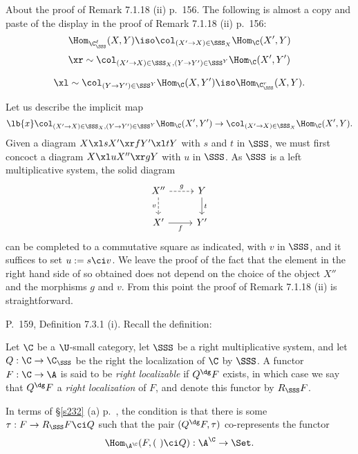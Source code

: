 \documentclass[12pt]{article}
\theoremstyle{remark}
\theoremstyle{definition}
\begin{document}
%

\begin{s}%
%
About the proof of Remark 7.1.18 (ii) p.~156. The following is almost a copy and paste of the display in the proof of Remark 7.1.18 (ii) p.~156: 
$$
\Hom_{\C_\SSS^\ell}(X,Y)\iso\col_{(X'\to X)\in\SSS_X}\Hom_\C(X',Y)
$$ 
$$
\xr\sim\col_{(X'\to X)\in\SSS_X,(Y\to Y')\in\SSS^Y}\Hom_\C(X',Y')
$$ 

$$\xl\sim\col_{(Y\to Y')\in\SSS^Y}\Hom_\C(X,Y')\iso\Hom_{\C_\SSS^r}(X,Y).$$ 

Let us describe the implicit map 
\begin{equation}\lb{x}
\col_{(X'\to X)\in\SSS_X,(Y\to Y')\in\SSS^Y}\Hom_\C(X',Y')\to\col_{(X'\to X)\in\SSS_X}\Hom_\C(X',Y).
\end{equation} 
Given a diagram $X\xl sX'\xr fY'\xl tY$ with $s$ and $t$ in $\SSS$, we must first concoct a diagram $X\xl uX''\xr gY$ with $u$ in $\SSS$. As $\SSS$ is a left multiplicative system, the solid diagram 
$$
\begin{tikzcd}
X''\ar[dashed]{d}[swap]{v}\ar[dashed]{r}{g}&Y\ar{d}{t}\\ 
X'\ar{r}[swap]{f}&Y'
\end{tikzcd}
$$ 
can be completed to a commutative square as indicated, with $v$ in $\SSS$, and it suffices to set $u:=s\ci v$. We leave the proof of the fact that the element in the right hand side of  so obtained does not depend on the choice of the object $X''$ and the morphisms $g$ and $v$. From this point the proof of Remark 7.1.18 (ii) is straightforward.
\end{s}

%

\begin{s} 
P.~159, Definition 7.3.1 (i). Recall the definition: 

Let $\C$ be a $\U$-small category, let $\SSS$ be a right multiplicative system, and let $Q:\C\to\C_\SSS$ be the right the localization of $\C$ by $\SSS$. A functor $F:\C\to\A$ is said to be {\em right localizable} if $Q^\dg F$ exists, in which case we say that $Q^\dg F$ a {\em right localization} of $F$, and denote this functor by $R_\SSS F$. 

%

In terms of \S\ref{s232} (a) p.~, the condition is that there is some $\tau:F\to R_\SSS F\ci Q$ such that the pair $(Q^\dg F,\tau)$ co-represents the functor 
$$
\Hom_{\A^\C}(F,(\ )\ci Q):\A^\C\to\Set.
$$ 
\end{s}
\end{document}

